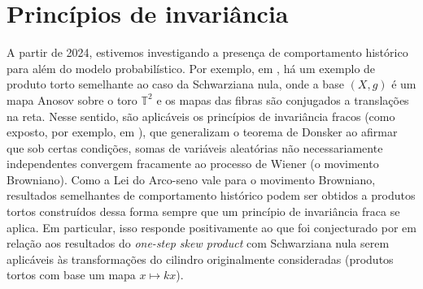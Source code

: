 \documentclass[../fapesp0]{subfiles}
\begin{document}
\section{Princípios de invariância}
A partir de 2024, estivemos investigando a presença de comportamento histórico para além do modelo probabilístico. Por exemplo, em \cite{crovisierEmpiricalMeasuresPartially2020}, há um exemplo de produto torto semelhante ao caso da Schwarziana nula, onde a base \((X,g)\) é um mapa Anosov sobre o toro \(\mathbb{T}^2\) e os mapas das fibras são conjugados a translações na reta. Nesse sentido, são aplicáveis os princípios de invariância fracos (como exposto, por exemplo, em \cite{billingsleyConvergenceProbabilityMeasures1999,dolgopyatLimitTheoremsPartially2003}), que generalizam o teorema de Donsker ao afirmar que sob certas condições, somas de variáveis aleatórias não necessariamente independentes convergem fracamente ao processo de Wiener (o movimento Browniano). Como a Lei do Arco-seno vale para o movimento Browniano, resultados semelhantes de comportamento histórico podem ser obtidos a produtos tortos construídos dessa forma sempre que um princípio de invariância fraca se aplica. Em particular, isso responde positivamente ao que foi conjecturado por \citeauthor{bonifantSchwarzianDerivativesCylinder2008} em relação aos resultados do \textit{one-step skew product} com Schwarziana nula serem aplicáveis às transformações do cilindro originalmente consideradas (produtos tortos com base um mapa \(x \mapsto kx\)).
\end{document}
